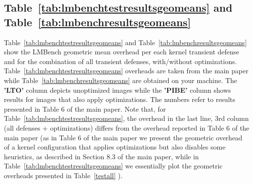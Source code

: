 \documentclass{article}
\begin{document}
\subsection{Table~\ref{tab:lmbenchtestresultsgeomeans} and Table~\ref{tab:lmbenchresultsgeomeans}}
Table~\ref{tab:lmbenchtestresultsgeomeans} and Table~\ref{tab:lmbenchresultsgeomeans} show the LMBench 
geometric mean overhead per each kernel transient defense and for the combination of all transient defenses,
with/without optimizations. 
Table~\ref{tab:lmbenchtestresultsgeomeans} overheads are taken from the main paper while Table~\ref{tab:lmbenchresultsgeomeans}
are obtained on your machine. 
The \textbf{'LTO'} column depicts unoptimized images while the \textbf{'PIBE'}
column shows results for images that also apply optimizations.
The numbers refer to results presented in Table 6 of the main paper.
Note that, for Table~\ref{tab:lmbenchtestresultsgeomeans}, the overhead in the last line, 3rd column (all defenses + optimizations) differs from the overhead reported
 in Table 6 of the main paper (as in Table 6 of the main paper we present the geometric 
overhead of a kernel configuration that applies optimizations but also disables some heuristics, as described in 
Section 8.3 of the main paper, while in Table~\ref{tab:lmbenchtestresultsgeomeans} we essentially plot the geometric
overheads presented in Table~\ref{testall} ).

\begin{table}[H]
\begin{center}

\end{center}
\label{tab:lmbenchtestresultsgeomeans} 
\end{table}

\begin{table}[H]
\begin{center}

\end{center}
\label{tab:lmbenchresultsgeomeans} 
\end{table}
\end{document}
